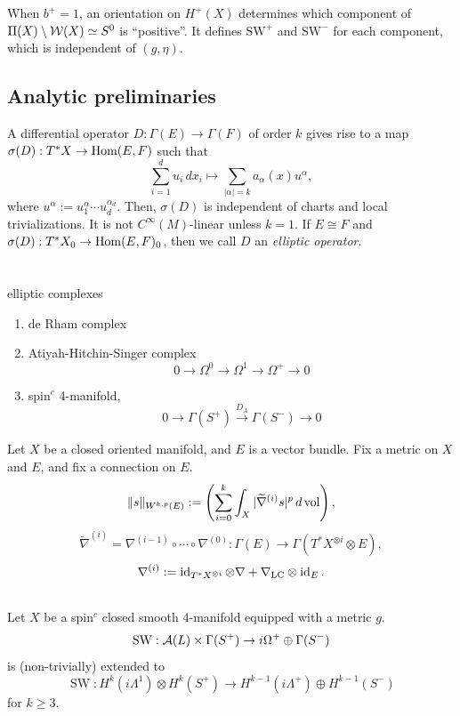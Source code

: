 \documentclass{../../../small}
\begin{document}
When $b^+=1$, an orientation on $H^+(X)$ determines which component of $\Pi(X)\setminus\mathcal{W}(X)\simeq S^0$ is ``positive''.
It defines $\mathrm{SW}^+$ and $\mathrm{SW}^-$ for each component, which is independent of $(g,\eta)$.


\subsection*{Analytic preliminaries}

A differential operator $D:\Gamma(E)\to\Gamma(F)$ of order $k$ gives rise to a map $\sigma(D):T^*X\to\operatorname{Hom}(E,F)$ such that
\[\sum_{i=1}^du_i\,dx_i\mapsto\sum_{|\alpha|=k}a_\alpha(x)u^\alpha,\]
where $u^\alpha:=u_1^\alpha\cdots u_d^{\alpha_d}$.
Then, $\sigma(D)$ is independent of charts and local trivializations.
It is not $C^\infty(M)$-linear unless $k=1$.
If $E\cong F$ and $\sigma(D):T^*X_0\to\operatorname{Hom}(E,F)_0$, then we call $D$ an \emph{elliptic operator}.





\newpage
\section{}


elliptic complexes
\begin{enumerate}
\item de Rham complex
\item Atiyah-Hitchin-Singer complex
\[0\to\Omega^0\to\Omega^1\to\Omega^+\to0\]
\item
spin$^c$ 4-manifold,
\[0\to\Gamma(S^+)\xrightarrow{D_A}\Gamma(S^-)\to0\]
\end{enumerate}

Let $X$ be a closed oriented manifold, and $E$ is a vector bundle.
Fix a metric on $X$ and $E$, and fix a connection on $E$.
\[\|s\|_{W^{k,p}(E)}:=\left(\sum_{i=0}^k\int_X|\widetilde\nabla^{(i)}s|^p\,d\operatorname{vol}\right),\]
\[\tilde\nabla^{(i)}=\nabla^{(i-1)}\circ\cdots\circ\nabla^{(0)}:\Gamma(E)\to\Gamma(T^*X^{\otimes i}\otimes E),\]
\[\nabla^{(i)}:=\operatorname{id}_{T^*X^{\otimes i}}\otimes\nabla+\nabla_{\mathrm{LC}}\otimes\operatorname{id}_E.\]



\subsection{}
Let $X$ be a spin$^c$ closed smooth 4-manifold equipped with a metric $g$.
\[\operatorname{SW}:\mathcal{A}(L)\times\Gamma(S^+)\to i\Omega^+\oplus\Gamma(S^-)\]
is (non-trivially) extended to
\[\operatorname{SW}:H^k(i\Lambda^1)\otimes H^k(S^+)\to H^{k-1}(i\Lambda^+)\oplus H^{k-1}(S^-)\]
for $k\ge3$.
\end{document}
